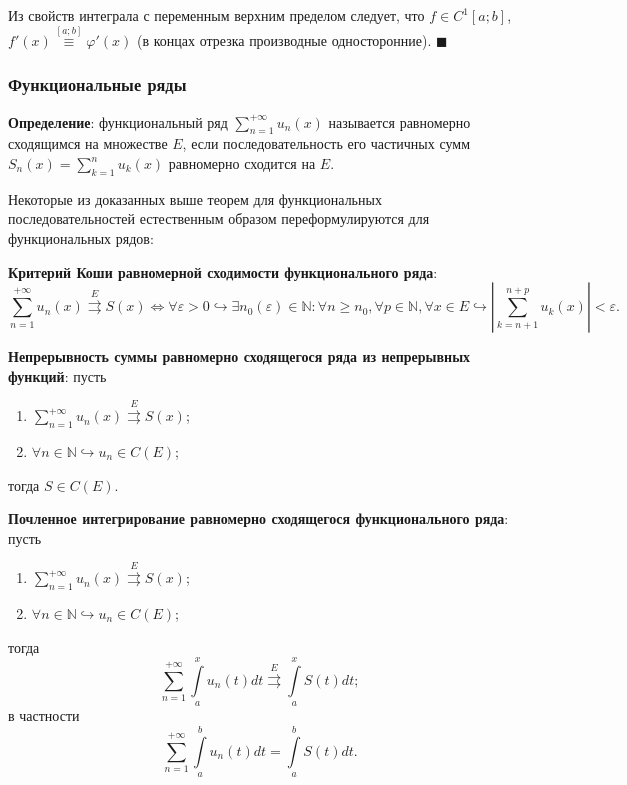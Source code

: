 \documentclass[12pt, a4paper, reqno]{article}
\begin{document}
    Из свойств интеграла с переменным верхним пределом следует, что $f \in C^1[a; b]$,
    $f'(x) \overset{[a; b]}{\equiv} \varphi'(x)$ (в концах отрезка производные односторонние).
    $\blacksquare$

    \subsubsection{Функциональные ряды}

    \textbf{Определение}: функциональный ряд $\sum\limits_{n = 1}^{+\infty} u_n(x)$ называется равномерно
    сходящимся на множестве $E$, если последовательность его частичных сумм $S_n(x) =
    \sum\limits_{k = 1}^{n} u_k(x)$ равномерно сходится на $E$.

    Некоторые из доказанных выше теорем для функциональных последовательностей естественным образом
    переформулируются для функциональных рядов:

    \textbf{Критерий Коши равномерной сходимости функционального ряда}:
    \begin{equation*}
        \sum\limits_{n = 1}^{+\infty} u_n(x) \overset{E}{\rightrightarrows} S(x) \iff
        \forall \varepsilon > 0 \hookrightarrow \exists n_0(\varepsilon) \in \mathbb{N}: \forall n \geq n_0,
        \forall p \in \mathbb{N}, \forall x \in E \hookrightarrow
            \left|\sum\limits_{k = n + 1}^{n + p} u_k(x)\right| < \varepsilon.
    \end{equation*}

    \textbf{Непрерывность суммы равномерно сходящегося ряда из непрерывных функций}: пусть
    \begin{enumerate}
        \item $\sum\limits_{n = 1}^{+\infty} u_n(x) \overset{E}{\rightrightarrows} S(x)$;
        \item $\forall n \in \mathbb{N} \hookrightarrow u_n \in C(E)$;
    \end{enumerate}
    тогда $S \in C(E)$.

    \textbf{Почленное интегрирование равномерно сходящегося функционального ряда}: пусть
    \begin{enumerate}
        \item $\sum\limits_{n = 1}^{+\infty} u_n(x) \overset{E}{\rightrightarrows} S(x)$;
        \item $\forall n \in \mathbb{N} \hookrightarrow u_n \in C(E)$;
    \end{enumerate}
    тогда
    \begin{equation*}
        \sum\limits_{n = 1}^{+\infty} \int\limits_{a}^{x} u_n(t)dt \overset{E}{\rightrightarrows}
        \int\limits_{a}^{x} S(t)dt;
    \end{equation*}
    в частности
    \begin{equation*}
        \sum\limits_{n = 1}^{+\infty} \int\limits_{a}^{b} u_n(t)dt =
        \int\limits_{a}^{b} S(t)dt.
    \end{equation*}
\end{document}

